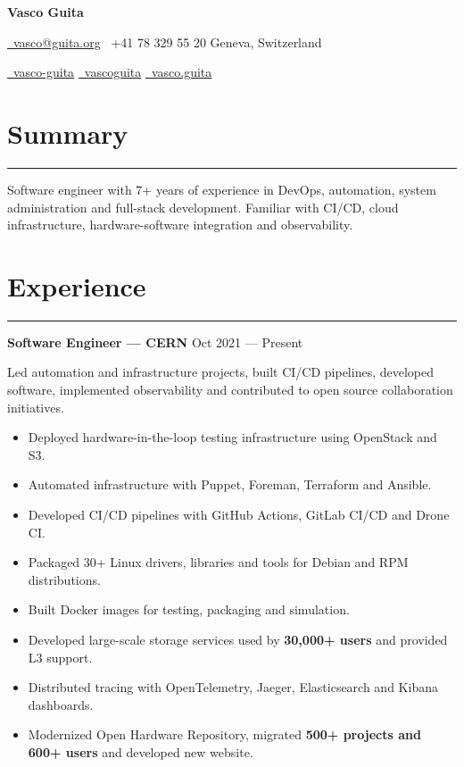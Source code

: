 \documentclass[11pt,a4paper]{article}
\begin{document}
\begin{center}
  {\huge \textbf{Vasco Guita}}

  \bigskip

  \href{mailto:vasco@guita.org}{\faAt\ vasco@guita.org}
  \quad
  \faPhone\ +41 78 329 55 20
  \quad
  \faMapMarker* Geneva, Switzerland

  \href{https://www.linkedin.com/in/vasco-guita}{\faLinkedin\ vasco-guita}
  \quad
  \href{https://github.com/vascoguita}{\faGithub\ vascoguita}
  \quad
  \href{https://gitlab.com/vasco.guita}{\faGitlab\ vasco.guita}
\end{center}

\bigskip

\section*{Summary}

\hrule

Software engineer with 7+ years of experience in DevOps, automation, system
administration and full-stack development. Familiar with CI/CD, cloud
infrastructure, hardware-software integration and observability.

\section*{Experience}

\hrule

\textbf{Software Engineer --- CERN}
\hfill
Oct 2021 --- Present

Led automation and infrastructure projects, built CI/CD pipelines, developed
software, implemented observability and contributed to open source collaboration
initiatives.

\begin{itemize}[noitemsep]
  \item Deployed hardware-in-the-loop testing infrastructure using OpenStack and
  S3.
  \item Automated infrastructure with Puppet, Foreman, Terraform and Ansible.
  \item Developed CI/CD pipelines with GitHub Actions, GitLab CI/CD and Drone
  CI\@.
  \item Packaged 30+ Linux drivers, libraries and tools for Debian and RPM
  distributions.
  \item Built Docker images for testing, packaging and simulation.
  \item Developed large-scale storage services used by \textbf{30,000+ users}
  and provided L3 support.
  \item Distributed tracing with OpenTelemetry, Jaeger, Elasticsearch and Kibana
  dashboards.
  \item Modernized Open Hardware Repository, migrated
  \textbf{500+ projects and 600+ users} and developed new website.
\end{itemize}
\end{document}
